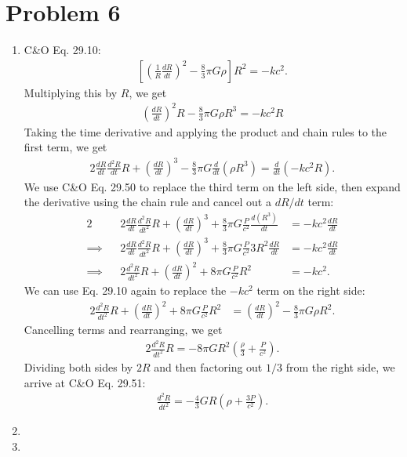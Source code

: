 \documentclass[11pt,letterpaper]{article}
\begin{document}
\section*{Problem 6}
\begin{enumerate}[label=(\roman*)]
    \item C\&O Eq. 29.10:
        \begin{align*}
            \left[\left(\frac{1}{R}\frac{dR}{dt}\right)^2 - \frac{8}{3}\pi G\rho\right]R^2 = -kc^2.
        \end{align*}
        Multiplying this by $R$, we get 
        \begin{align*}
            \left(\frac{dR}{dt}\right)^2 R - \frac{8}{3}\pi G\rho R^3 = -kc^2R 
        \end{align*}
        Taking the time derivative and applying the product and chain rules to the first term, we get 
        \begin{align*}
            2\frac{dR}{dt}\frac{d^2R}{dt}R + \left(\frac{dR}{dt}\right)^3 - \frac{8}{3}\pi G \frac{d}{dt}(\rho R^3) = \frac{d}{dt}(-kc^2R).
        \end{align*}
        We use C\&O Eq. 29.50 to replace the third term on the left side, then expand the derivative using the chain rule and cancel out a $dR/dt$ term:
        \begin{alignat*}{2}
            &&2\frac{dR}{dt}\frac{d^2R}{dt^2}R + \left(\frac{dR}{dt}\right)^3 + \frac{8}{3}\pi G\frac{P}{c^2}\frac{d(R^3)}{dt} &= -kc^2\frac{dR}{dt} \\
            \implies&&2\frac{dR}{dt}\frac{d^2R}{dt^2}R + \left(\frac{dR}{dt}\right)^3 + \frac{8}{3}\pi G\frac{P}{c^2}3R^2\frac{dR}{dt} &= -kc^2\frac{dR}{dt} \\
            \implies&&2\frac{d^2R}{dt^2}R + \left(\frac{dR}{dt}\right)^2 + 8\pi G\frac{P}{c^2}R^2 &= -kc^2.
        \end{alignat*}
        We can use Eq. 29.10 again to replace the $-kc^2$ term on the right side: 
        \begin{align*}
            2\frac{d^2R}{dt^2}R + \left(\frac{dR}{dt}\right)^2 + 8\pi G\frac{P}{c^2}R^2 &= \left(\frac{dR}{dt}\right)^2 - \frac{8}{3}\pi G\rho R^2.
        \end{align*}
        Cancelling terms and rearranging, we get 
        \begin{align*}
            2\frac{d^2R}{dt^2}R = -8\pi GR^2(\frac{\rho}{3} + \frac{P}{c^2}).
        \end{align*}
        Dividing both sides by $2R$ and then factoring out $1/3$ from the right side, we arrive at C\&O Eq. 29.51:
        \begin{align*}
            \frac{d^2R}{dt^2} = -\frac{4}{3}GR(\rho + \frac{3P}{c^2}).
        \end{align*}
    \item 
    \item 
\end{enumerate}
\end{document}
